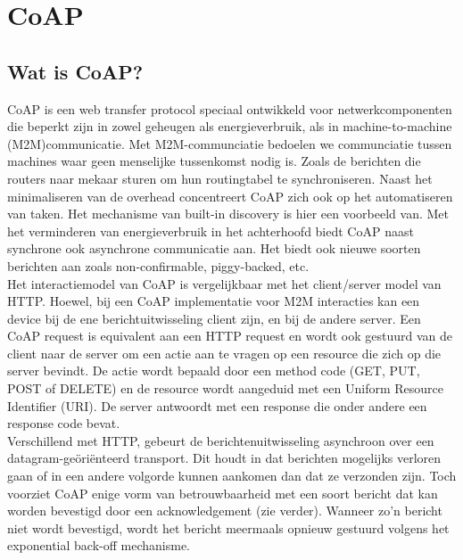 \chapter{CoAP} \label{CoAP}

\section{Wat is CoAP?}

CoAP is een web transfer protocol speciaal ontwikkeld voor netwerkcomponenten die beperkt zijn in zowel geheugen als energieverbruik, als in machine-to-machine (M2M)communicatie. Met M2M-communciatie bedoelen we communciatie tussen machines waar geen menselijke tussenkomst nodig is. Zoals de berichten die routers naar mekaar sturen om hun routingtabel te synchroniseren. Naast het minimaliseren van de overhead concentreert CoAP zich ook op het automatiseren van taken. Het mechanisme van built-in discovery is hier een voorbeeld van. Met het verminderen van energieverbruik in het achterhoofd biedt CoAP naast synchrone ook asynchrone communicatie aan. Het biedt ook nieuwe soorten berichten aan zoals non-confirmable, piggy-backed, etc.\\

Het interactiemodel van CoAP is vergelijkbaar met het client/server model van HTTP. Hoewel, bij een CoAP implementatie voor M2M interacties kan een device bij de ene berichtuitwisseling client zijn, en bij de andere server. Een CoAP request is equivalent aan een HTTP request en wordt ook gestuurd van de client naar de server om een actie aan te vragen op een resource die zich op die server bevindt. De actie wordt bepaald door een method code (GET, PUT, POST of DELETE) en de resource wordt aangeduid met een Uniform Resource Identifier (URI). De server antwoordt met een response die onder andere een response code bevat.\\

Verschillend met HTTP, gebeurt de berichtenuitwisseling asynchroon over een datagram-ge\"{o}ri\"{e}nteerd transport. Dit houdt in dat berichten mogelijks verloren gaan of in een andere volgorde kunnen aankomen dan dat ze verzonden zijn. Toch voorziet CoAP enige vorm van betrouwbaarheid met een soort bericht dat kan worden bevestigd door een acknowledgement (zie verder). Wanneer zo'n bericht niet wordt bevestigd, wordt het bericht meermaals opnieuw gestuurd volgens het exponential back-off mechanisme.

